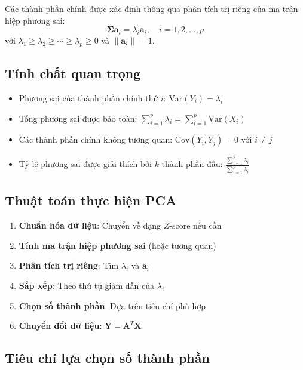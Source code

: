 \begin{dl}
Các thành phần chính được xác định thông qua phân tích trị riêng của ma trận hiệp phương sai:
\[
\boldsymbol{\Sigma}\mathbf{a}_i = \lambda_i\mathbf{a}_i, \quad i = 1, 2, \ldots, p
\]
với $\lambda_1 \geq \lambda_2 \geq \cdots \geq \lambda_p \geq 0$ và $\|\mathbf{a}_i\| = 1$.
\end{dl}

\subsection{Tính chất quan trọng}
\begin{tinhchat}
\begin{itemize}
    \item Phương sai của thành phần chính thứ $i$: $\text{Var}(Y_i) = \lambda_i$
    \item Tổng phương sai được bảo toàn: $\sum_{i=1}^p \lambda_i = \sum_{i=1}^p \text{Var}(X_i)$
    \item Các thành phần chính không tương quan: $\text{Cov}(Y_i, Y_j) = 0$ với $i \neq j$
    \item Tỷ lệ phương sai được giải thích bởi $k$ thành phần đầu: $\frac{\sum_{i=1}^k \lambda_i}{\sum_{i=1}^p \lambda_i}$
\end{itemize}
\end{tinhchat}

\subsection{Thuật toán thực hiện PCA}
\begin{enumerate}
    \item \textbf{Chuẩn hóa dữ liệu}: Chuyển về dạng $Z$-score nếu cần
    \item \textbf{Tính ma trận hiệp phương sai} (hoặc tương quan)
    \item \textbf{Phân tích trị riêng}: Tìm $\lambda_i$ và $\mathbf{a}_i$
    \item \textbf{Sắp xếp}: Theo thứ tự giảm dần của $\lambda_i$
    \item \textbf{Chọn số thành phần}: Dựa trên tiêu chí phù hợp
    \item \textbf{Chuyển đổi dữ liệu}: $\mathbf{Y} = \mathbf{A}^T\mathbf{X}$
\end{enumerate}

\subsection{Tiêu chí lựa chọn số thành phần}
